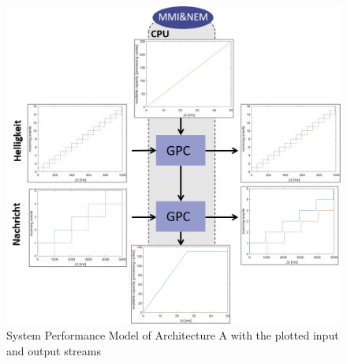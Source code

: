 \begin{figure}
    \centering
    \includegraphics[width=0.9\columnwidth]{graphics/system_B.png}
    \caption{System Performance Model of Architecture A with the plotted input and output streams}\label{fig:system-B}
\end{figure}